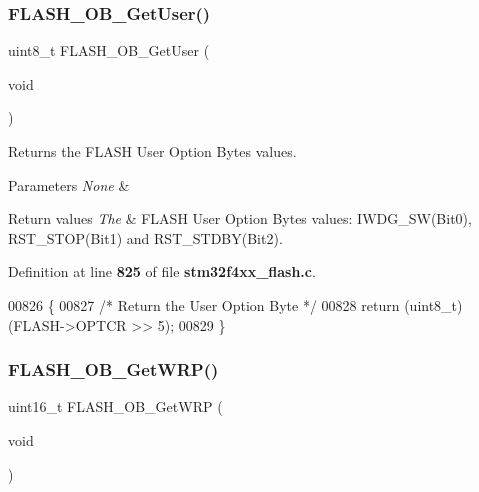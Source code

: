 \subsubsection{F\+L\+A\+S\+H\+\_\+\+O\+B\+\_\+\+Get\+User()}
{\footnotesize\ttfamily uint8\+\_\+t F\+L\+A\+S\+H\+\_\+\+O\+B\+\_\+\+Get\+User (\begin{DoxyParamCaption}\item[{void}]{ }\end{DoxyParamCaption})}



Returns the F\+L\+A\+SH User Option Bytes values. 


\begin{DoxyParams}{Parameters}
{\em None} & \\
\hline
\end{DoxyParams}

\begin{DoxyRetVals}{Return values}
{\em The} & F\+L\+A\+SH User Option Bytes values\+: I\+W\+D\+G\+\_\+\+S\+W(\+Bit0), R\+S\+T\+\_\+\+S\+T\+O\+P(\+Bit1) and R\+S\+T\+\_\+\+S\+T\+D\+B\+Y(\+Bit2). \\
\hline
\end{DoxyRetVals}


Definition at line \textbf{ 825} of file \textbf{ stm32f4xx\+\_\+flash.\+c}.


\begin{DoxyCode}
00826 \{
00827   \textcolor{comment}{/* Return the User Option Byte */}
00828   \textcolor{keywordflow}{return} (uint8\_t)(FLASH->OPTCR >> 5);
00829 \}
\end{DoxyCode}
\mbox{\label{group__FLASH__Group3_gafa2aec5fa1ea7a73c31f3405f465c525}} 
\subsubsection{F\+L\+A\+S\+H\+\_\+\+O\+B\+\_\+\+Get\+W\+R\+P()}
{\footnotesize\ttfamily uint16\+\_\+t F\+L\+A\+S\+H\+\_\+\+O\+B\+\_\+\+Get\+W\+RP (\begin{DoxyParamCaption}\item[{void}]{ }\end{DoxyParamCaption})}



